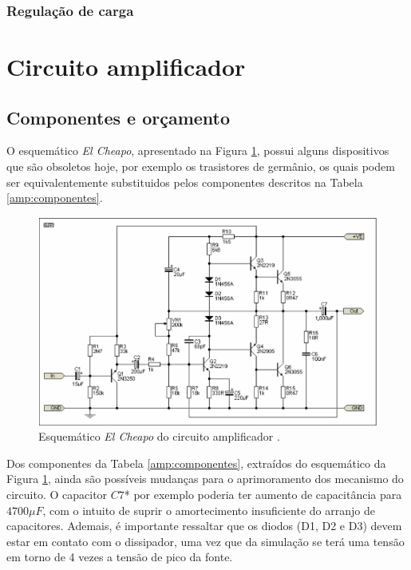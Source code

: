 \documentclass[a4paper,12pt,oneside,openany,table,xcdraw]{article}
\begin{document}
\subsubsection{Regulação de carga}


\newpage
\section{Circuito amplificador} \label{amp}
\subsection{Componentes e orçamento} 
O esquemático \emph{El Cheapo}, apresentado na Figura \ref{amp:esquematico}, possui alguns dispositivos que são obsoletos hoje, por exemplo os trasistores de germânio, os quais podem ser equivalentemente substituidos pelos componentes descritos na Tabela \ref{amp:componentes}. 
\vspace{0.2cm}

\begin{figure}[H]
\centering
\includegraphics[width=15cm]{amp-esquematico}
\caption{Esquemático \emph{El Cheapo} do circuito amplificador \cite{cheapo}.}
\label{amp:esquematico}
\end{figure}

\vspace{0.4cm}
Dos componentes da Tabela \ref{amp:componentes}, extraídos do esquemático da Figura \ref{amp:esquematico}, ainda são possíveis mudanças para o aprimoramento dos mecanismo do circuito. O capacitor $C7$* por exemplo poderia ter aumento de capacitância para $4700 \mu F$, com o intuito de suprir o amortecimento insuficiente do arranjo de capacitores. %
Ademais, é importante ressaltar que os diodos (D1, D2 e D3) devem estar em contato com o dissipador, uma vez que da simulação se terá uma tensão em torno de 4 vezes a tensão de pico da fonte. %
\end{document}
